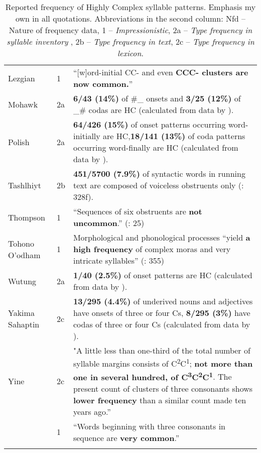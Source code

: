 \begin{sidewaystable}
\begin{tabularx}{\textwidth}{p{1.25cm}lQ}
{Lezgian} & 1 & “[w]ord-initial CC- and even \textbf{{CCC- clusters are now common.}}” 
\citep[46]{Haspelmath1993}\\
{Mohawk} & 2a & \textbf{6/43 {(14\%)}} of \#\_ onsets and \textbf{3/25 {(12\%)}} of \_\# codas are HC (calculated from data by \citealt[12--13]{Michelson1988}).\\
{Polish} & 2a & \textbf{{64/426 (15\%)}} of onset patterns occurring word-initially are HC,\textbf{18/141 (13\%)} of coda patterns occurring word-finally are HC (calculated from data by \citealt{Bargiełowna1950}).\\
{Tashlhiyt} & 2b & \textbf{{451/5700 (7.9\%)}} of syntactic words in running text are composed of voiceless obstruents only (\citealt{Ridouane2008}: 328f).\\
{Thompson} & 1 & “Sequences of six obstruents are\textbf{ \textbf{not} {uncommon}}.” (\citealt{ThompsonThompson1992}: 25)\\
{Tohono O’odham} & 1 & Morphological and phonological processes “yield \textbf{{a high frequency}} of complex moras and very intricate syllables” (\citealt{HillZepeda1992}: 355)\\
{Wutung} & 2a & \textbf{{1/40 (2.5\%)}} of onset patterns are HC (calculated from data by \citealt{Marmion2010}).\\
{Yakima Sahaptin} & 2c & \textbf{{13/295 (4.4\%)}} of underived nouns and adjectives have onsets of three or four Cs, \textbf{{8/295 (3\%)}} have codas of three or four Cs (calculated from data by \citealt{HargusBeavert2006}).\\
{Yine} & 2c & "A little less than one-third of the total number of syllable margins consists of C\textsuperscript{2}C\textsuperscript{1}; \textbf{{not more than one in several hundred, of C}}\textbf{{\textsuperscript{3}}}\textbf{{C}}\textbf{{\textsuperscript{2}}}\textbf{{C}}\textbf{{\textsuperscript{1}}}. The present count of clusters of three consonants shows \textbf{{lower frequency}} than a similar count made ten years ago.” \citep[24]{Matteson1965}\\
              & 1 &  “Words beginning with three consonants in sequence are \textbf{{very common}}.” \citep[26]{Hanson2010}\\
\lspbottomrule
\end{tabularx}
\caption{\label{tab:3.14}Reported frequency of Highly Complex syllable patterns. Emphasis my own in all quotations. Abbreviations in the second column: Nfd -- Nature of frequency data, 1 -- \textit{Impressionistic}, 2a -- \textit{Type frequency in syllable inventory
}, 2b -- \textit{Type frequency in text}, 2c -- \textit{Type frequency in lexicon}.}
\end{sidewaystable}

